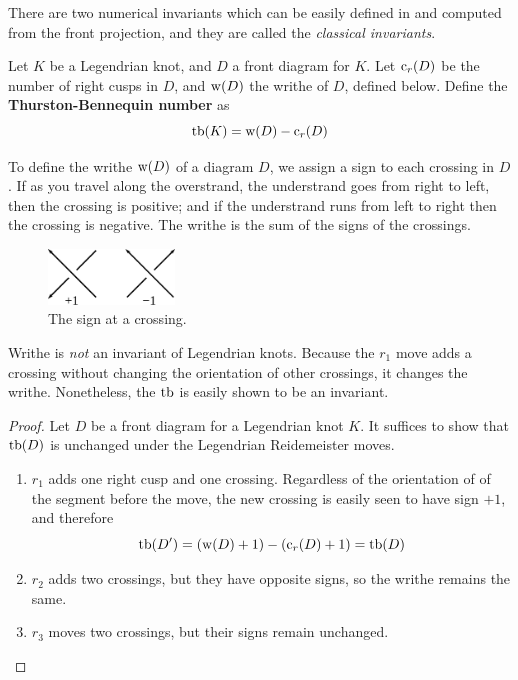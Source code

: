 There are two numerical invariants which can be easily defined in and computed from the front projection, and they are called the \emph{classical invariants}.
\begin{definition}
    Let $K$ be a Legendrian knot, and $D$ a front diagram for $K$. Let $\operatorname{c}_r(D)$ be the number of right cusps in $D$, and $\operatorname{w}(D)$ the writhe of $D$, defined below.
    Define the \textbf{Thurston-Bennequin number} as
    \[
        \operatorname{tb}(K) = \operatorname{w}(D) - \operatorname{c}_r(D)
    \]
\end{definition}
To define the writhe $\operatorname{w}(D)$ of a diagram $D$, we assign a sign to each crossing in $D$. If as you travel along the overstrand, the understrand goes from right to left, then the crossing is positive; and if the understrand runs from left to right then the crossing is negative. The writhe is the sum of the signs of the crossings.

\begin{figure}[ht]
    \centering
    \includegraphics[width=0.3\textwidth]{images/writhe.pdf}
    \caption{The sign at a crossing.}%
    \label{fig:writhe}
\end{figure}

Writhe is \emph{not} an invariant of Legendrian knots. Because the $r_1$ move adds a crossing without changing the orientation of other crossings, it changes the writhe. Nonetheless, the $\operatorname{tb}$ is easily shown to be an invariant.

\begin{proof}
    Let $D$ be a front diagram for a Legendrian knot $K$. It suffices to show that $\operatorname{tb}(D)$ is unchanged under the Legendrian Reidemeister moves.

    \begin{enumerate}
        \item $r_1$ adds one right cusp and one crossing. Regardless of the orientation of of the segment before the move, the new crossing is easily seen to have sign $+1$, and therefore
            \[
                \operatorname{tb}(D') = (\operatorname{w}(D) + 1) - (\operatorname{c}_r(D) + 1) = \operatorname{tb}(D)
            \]
        \item $r_2$ adds two crossings, but they have opposite signs, so the writhe remains the same.
        \item $r_3$ moves two crossings, but their signs remain unchanged.
    \end{enumerate}
    
\end{proof}

